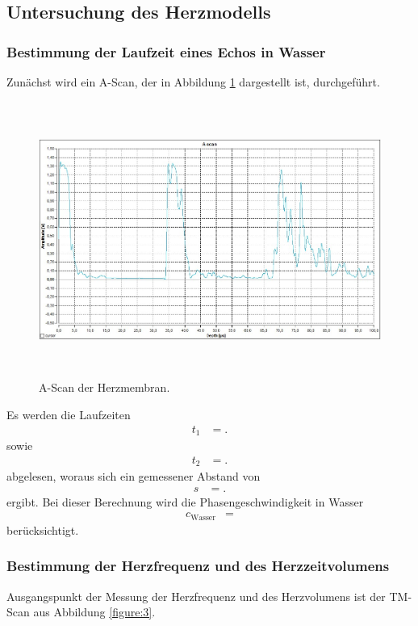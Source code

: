 \subsection{Untersuchung des Herzmodells}

\subsubsection{Bestimmung der Laufzeit eines Echos in Wasser}

Zunächst wird ein A-Scan, der in Abbildung \ref{figure:5} dargestellt ist, durchgeführt.

\begin{figure}[H]
  \centering
  \includegraphics[height=9cm]{messdaten/herz_a.png}
  \caption{A-Scan der Herzmembran.}
  \label{figure:5}
\end{figure}
Es werden die Laufzeiten
\begin{align*}
  t_1 &= .
\end{align*}
sowie
\begin{align*}
  t_2 &= .
\end{align*}
abgelesen, woraus sich ein gemessener Abstand von
\begin{align*}
  s &= .
\end{align*}
ergibt.
Bei dieser Berechnung wird die Phasengeschwindigkeit in Wasser
\begin{align*}
  c_{\text{Wasser}} &= 
\end{align*}
berücksichtigt.\cite{schall}

\subsubsection{Bestimmung der Herzfrequenz und des Herzzeitvolumens}
Ausgangspunkt der Messung der Herzfrequenz und des Herzvolumens ist der TM-Scan aus Abbildung \ref{figure:3}.

